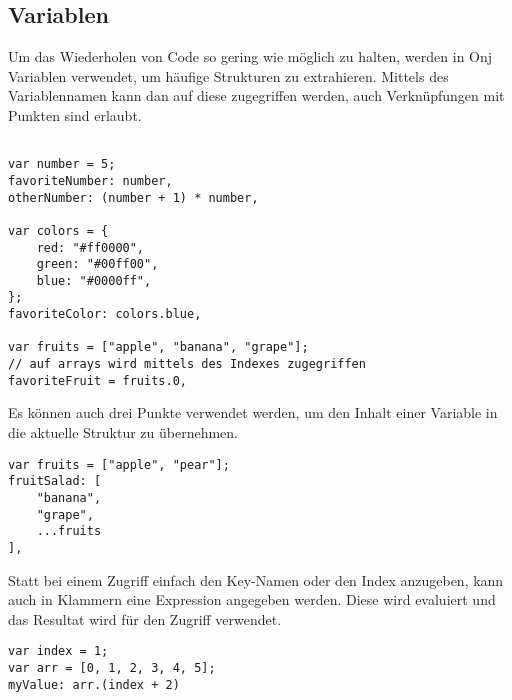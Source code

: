 
\subsection{Variablen}\label{subsec:variablen}

\renewcommand{\kapitelautor}{Autor: Marvin Kurka}

Um das Wiederholen von Code so gering wie möglich zu halten, werden in Onj Variablen verwendet, um häufige Strukturen
zu extrahieren.
Mittels des Variablennamen kann dan auf diese zugegriffen werden, auch Verknüpfungen mit Punkten sind erlaubt.

\begin{verbatim}

var number = 5;
favoriteNumber: number,
otherNumber: (number + 1) * number,

var colors = {
    red: "#ff0000",
    green: "#00ff00",
    blue: "#0000ff",
};
favoriteColor: colors.blue,

var fruits = ["apple", "banana", "grape"];
// auf arrays wird mittels des Indexes zugegriffen
favoriteFruit = fruits.0,
\end{verbatim}

Es können auch drei Punkte verwendet werden, um den Inhalt einer Variable in die aktuelle Struktur zu übernehmen.

\begin{verbatim}
var fruits = ["apple", "pear"];
fruitSalad: [
    "banana",
    "grape",
    ...fruits
],
\end{verbatim}

Statt bei einem Zugriff einfach den Key-Namen oder den Index anzugeben, kann auch in Klammern eine Expression angegeben
werden.
Diese wird evaluiert und das Resultat wird für den Zugriff verwendet.

\begin{verbatim}
var index = 1;
var arr = [0, 1, 2, 3, 4, 5];
myValue: arr.(index + 2)
\end{verbatim}

\renewcommand{\kapitelautor}{}
